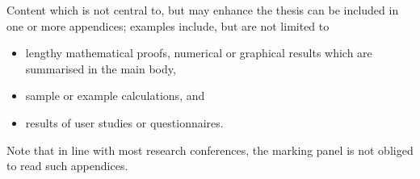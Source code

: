 \documentclass[ %
                    author={Sam Phippen},
                supervisor={Dr. Rafal Bogacz},
                     title={Real time voice activity detectors in noisy personal computing environments},
                  subtitle={},
                    degree={MEng},
                      year={2012} ]{thesis}
\begin{document}
Content which is not central to, but may enhance the thesis can be
included in one or more appendices; examples include, but are not 
limited to

\begin{itemize}
\item lengthy mathematical proofs, numerical or graphical results
      which are summarised in the main body,
\item sample or example calculations, 
      and
\item results of user studies or questionnaires.
\end{itemize}

\noindent
Note that in line with most research conferences, the marking panel 
is not obliged to read such appendices.

\end{document}
